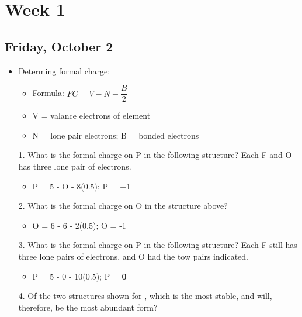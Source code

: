 \documentclass[12pt,a4paper]{article}
\begin{document}
\tableofcontents
\cleardoublepage
\fancyhead{}


\clearpage
\section{Week 1}
\subsection{Friday, October 2}
\begin{itemize}
    \item Determing formal charge:
    \begin{itemize}
        \item Formula: {\color{o-Sun}\(FC = V - N - \dfrac{B}{2}\)}
        \item V = valance electrons of element
        \item N = lone pair electrons; B = bonded electrons
    \end{itemize}
    \item[1.] What is the formal charge on P in the following structure?  Each F and O has three lone pair of electrons.
        \begin{itemize}
            \item P = 5 - O - 8(0.5); P = {\color{pos}+1}
        \end{itemize}
    \item[2.] What is the formal charge on O in the structure above?
        \begin{itemize}
            \item O = 6 - 6 - 2(0.5); O = {\color{neg}-1}
        \end{itemize}
    \item[3.] What is the formal charge on P in the following structure?  Each F still has three lone pairs of electrons, and O had the tow pairs indicated.
        \begin{itemize}
            \item P = 5 - 0 - 10(0.5); P = \textbf{0}
        \end{itemize}
    \item[4.] Of the two structures shown for , which is the most stable, and will, therefore, be the most abundant form?

\end{itemize}
\end{document}
